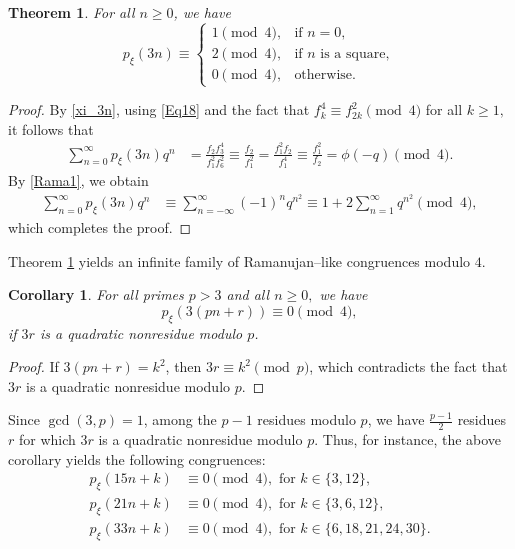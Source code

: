 \documentclass[12pt]{article}
\newtheorem{theorem}{Theorem}[section]
\newtheorem{corollary}{Corollary}[section]
\begin{document}
\begin{theorem} For all $n \geq 0$, we have
$$p_{\xi}(3n) \equiv  
\begin{cases}
1 \pmod{4}, & \mbox{if $n=0$},\\
2 \pmod{4}, & \mbox{if $n$ is a square}, \\
0 \pmod{4}, & \mbox{otherwise}.
\end{cases}$$	
\label{T2}
\end{theorem}

\begin{proof} By \eqref{xi_3n}, using \eqref{Eq18} and the fact that $f_k^4 \equiv f_{2k}^2 \pmod{4}$ for all $k\geq 1,$ it follows that
\begin{align*}
\sum_{n=0}^{\infty} p_{\xi}(3n)q^n & = \frac{f_{2}f_{3}^4}{f_{1}^2f_{6}^2} \equiv \frac{f_2}{f_1^2} = \frac{f_1^2f_2}{f_1^4} \equiv \frac{f_1^2}{f_ 2} = \phi(-q) \pmod{4}.
\end{align*}
By \eqref{Rama1}, we obtain
\begin{align*}
\sum_{n=0}^{\infty} p_{\xi}(3n)q^n & \equiv \sum_{n=-\infty}^{\infty} (-1)^n q^{n^2} \equiv 1 + 2\sum_{n=1}^{\infty} q^{n^2} \pmod{4},
\end{align*}
which completes the proof.
\end{proof}

Theorem \ref{T2} yields an infinite family of Ramanujan--like congruences modulo $4$.

\begin{corollary} For all primes $p > 3$ and all $n\geq 0,$ we have
$$p_{\xi}(3(pn+r)) \equiv 0 \pmod{4},$$
if $3r$ is a quadratic nonresidue modulo $p$.
\end{corollary}

\begin{proof}
If $3(pn+r) = k^2$, then $3r \equiv k^2 \pmod{p}$, which contradicts the fact that $3r$ is a quadratic nonresidue modulo $p$.
\end{proof}

Since $\gcd(3, p) = 1$, among the $p-1$ residues modulo $p$, we have $\frac{p-1}{2}$ residues $r$ for which $3r$ is a quadratic nonresidue modulo $p$. Thus, for instance, the above corollary yields the following congruences:
\begin{align*}
p_{\xi}(15n+k) & \equiv 0 \pmod{4}, \mbox{ for } k \in \{ 3, 12 \}, \\
p_{\xi}(21n+k) & \equiv 0 \pmod{4}, \mbox{ for } k \in \{ 3, 6, 12 \}, \\
p_{\xi}(33n+k) & \equiv 0 \pmod{4}, \mbox{ for } k \in \{ 6, 18, 21, 24, 30 \}.
\end{align*}
\end{document}
